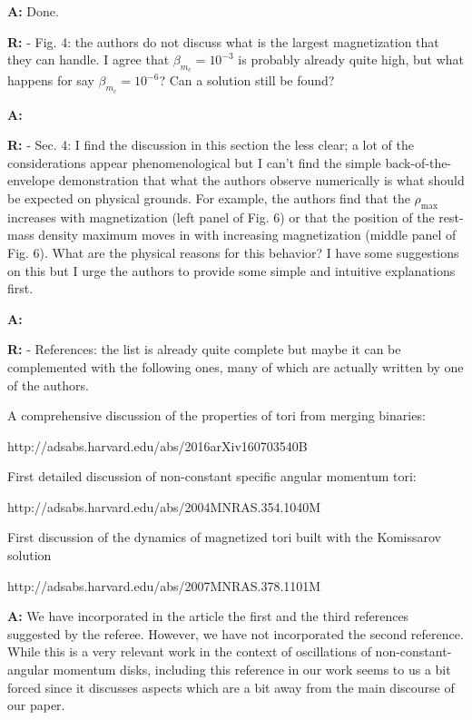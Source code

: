 \documentclass{article}
\begin{document}
\bigskip

{\bf A:} Done.

\bigskip

{\bf R:} - Fig. 4: the authors do not discuss what is the largest magnetization
that they can handle. I agree that $\beta_{m_c} = 10^{-3}$ is probably
already quite high, but what happens for say $\beta_{m_c} = 10^{-6}$? Can
a solution still be found?

\bigskip

{\bf A:} 

\bigskip

{\bf R:} - Sec. 4: I find the discussion in this section the less clear; a lot
of the considerations appear phenomenological but I can't find the
simple back-of-the-envelope demonstration that what the authors observe
numerically is what should be expected on physical grounds. For
example, the authors find that the $\rho_{\mathrm{max}}$ increases with magnetization
(left panel of Fig. 6) or that the position of the rest-mass density
maximum moves in with increasing magnetization (middle panel of
Fig. 6). What are the physical reasons for this behavior? I have some
suggestions on this but I urge the authors to provide some simple and
intuitive explanations first.

\bigskip

{\bf A:}

\bigskip

{\bf R:} - References: the list is already quite complete but maybe it can be
complemented with the following ones, many of which are actually
written by one of the authors.

A comprehensive discussion of the properties of tori from merging binaries:

http://adsabs.harvard.edu/abs/2016arXiv160703540B


First detailed discussion of non-constant specific angular momentum tori:

http://adsabs.harvard.edu/abs/2004MNRAS.354.1040M

First discussion of the dynamics of magnetized tori built with the Komissarov solution

http://adsabs.harvard.edu/abs/2007MNRAS.378.1101M

\bigskip

{\bf A:} We have incorporated in the article the first and the third references 
suggested by the referee. However, we have not incorporated the second 
reference. While this is a very relevant work in the context of oscillations 
of non-constant-angular momentum disks, including this reference in our 
work seems to us a bit forced since it discusses aspects which are a bit 
away from the main discourse of our paper.


\begin{small}
\begin{thebibliography}{99}
%

%  
\end{thebibliography}

 \end{small}

 
\end{document}
